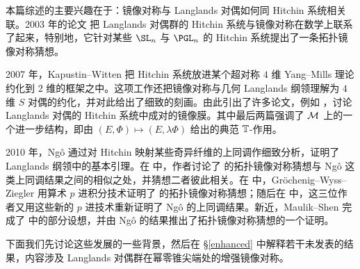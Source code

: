 本篇综述的主要兴趣在于：镜像对称与 Langlands 对偶如何同 Hitchin 系统相关联。2003 年的论文 \cite{hausel-thaddeus} 把 Langlands 对偶群的 Hitchin 系统与镜像对称在数学上联系了起来，特别地，它针对某些 $\SL_n$ 与 $\PGL_n$ 的 Hitchin 系统提出了一条拓扑镜像对称猜想。

2007 年，Kapustin--Witten \cite{kapustin-witten} 把 Hitchin 系统放进某个超对称 $4$ 维 Yang--Mills 理论约化到 $2$ 维的框架之中。这项工作还把镜像对称与几何 Langlands 纲领理解为 $4$ 维 $S$ 对偶的约化，并对此给出了细致的刻画。由此引出了许多论文，例如 \cite{baraglia-schaposnik,garcia-prada-etal,hitchin-characteristic,hausel-mellit-pei,hausel-hitchin}，讨论 Langlands 对偶的 Hitchin 系统中成对的镜像膜。其中最后两篇强调了 ${\mathcal{M}}$ 上的一个进一步结构，即由 $(E,\Phi)\mapsto (E,\lambda\Phi)$ 给出的典范 ${\mathbb{T}}$-作用。

2010 年，Ng\^{o} \cite{ngo} 通过对 Hitchin 映射某些奇异纤维的上同调作细致分析，证明了 Langlands 纲领中的基本引理。在 \cite{hausel-gths} 中，作者讨论了 \cite{hausel-thaddeus} 的拓扑镜像对称猜想与 Ng\^{o} 这类上同调结果之间的相似之处，并猜想二者彼此相关。在 \cite{groechenig-etal1} 中，Gr\"ochenig--Wyss--Ziegler 用算术 $p$ 进积分技术证明了 \cite{hausel-thaddeus} 的拓扑镜像对称猜想；随后在 \cite{groechenig-etal2} 中，这三位作者又用这些新的 $p$ 进技术重新证明了 Ng\^{o} 的上同调结果。新近，Maulik--Shen \cite{maulik-shen} 完成了 \cite{hausel-gths} 中的部分设想，并由 Ng\^{o} 的结果推出了拓扑镜像对称猜想的一个证明。

下面我们先讨论这些发展的一些背景，然后在 \S\ref{enhanced} 中解释若干未发表的结果，内容涉及 Langlands 对偶群在幂零锥尖端处的增强镜像对称。
